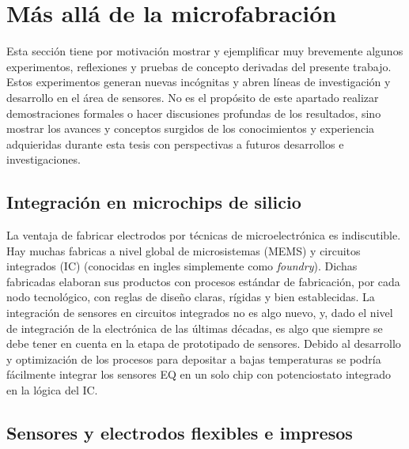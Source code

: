 {\section{Más allá de la microfabración}
	
	  Esta sección tiene por motivación mostrar y ejemplificar muy brevemente algunos experimentos, reflexiones y pruebas de concepto derivadas del presente trabajo. Estos experimentos generan nuevas incógnitas y abren líneas de investigación y desarrollo en el área de sensores. No es el propósito de este apartado realizar demostraciones formales o hacer discusiones profundas de los resultados, sino mostrar los avances y conceptos surgidos de los conocimientos y experiencia adquieridas durante esta tesis con perspectivas a futuros desarrollos e investigaciones.

	\subsection{Integración en microchips de silicio}

	  La ventaja de fabricar electrodos por técnicas de microelectrónica es indiscutible. Hay muchas fabricas a nivel global de microsistemas (MEMS) y circuitos integrados (IC) (conocidas en ingles simplemente como \textit{foundry}). Dichas fabricadas elaboran sus productos con procesos estándar de fabricación, por cada nodo tecnológico, con reglas de diseño claras, rígidas y bien establecidas. La integración de sensores en circuitos integrados no es algo nuevo, y, dado el nivel de integración de la electrónica de las últimas décadas, es algo que siempre se debe tener en cuenta en la etapa de prototipado de sensores.\cite{Wang2012,Liu1993,Novell2012,Yu2013,Sarkar2014} Debido al desarrollo y optimización de los procesos para depositar \pdm\space a bajas temperaturas se podría fácilmente integrar los sensores EQ en un solo chip con potenciostato integrado en la lógica del IC.
 	
 	\subsection{Sensores y electrodos flexibles e impresos}

}

